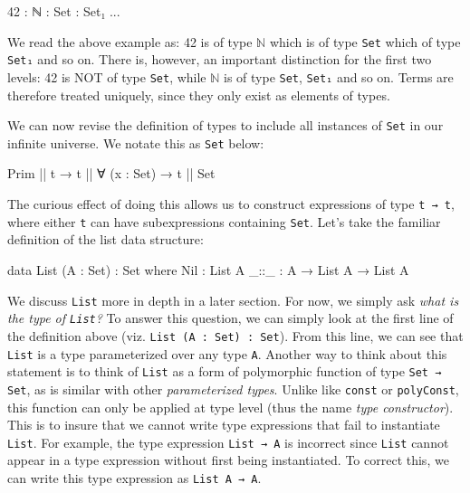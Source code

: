 \documentclass[12pt]{article}
\begin{document}
\begin{center}
\begin{minipage}{0.4\textwidth}
\begin{code}
42 : ℕ : Set : Set₁ ...
\end{code}
\end{minipage}
\end{center}

We read the above example as: 42 is of type \(\mathbb{N}\) which is of type
{\tt Set} which of type {\tt Set₁} and so on. There is, however, an important
distinction for the first two levels: 42 is NOT of type {\tt Set}, while
\(\mathbb{N}\) is of type {\tt Set}, {\tt Set₁} and so on. Terms are
therefore treated uniquely, since they only exist as elements of types.

We can now revise the definition of types to include all instances of
{\tt Set} in our infinite universe. We notate this as {\tt Set} below:

\begin{center}
\begin{minipage}{0.65\textwidth}
\begin{code}
Prim || t → t || ∀ (x : Set) → t || Set
\end{code}
\end{minipage}
\end{center}
The curious effect of doing this allows us to construct expressions of type
\mbox{{\tt t → t}}, where either {\tt t} can have subexpressions containing {\tt Set}.
Let's take the familiar definition of the list data structure:

\begin{center}
\begin{minipage}{0.65\textwidth}
\begin{code}
data List (A : Set) : Set where
  Nil  : List A
  _::_ : A → List A → List A
\end{code}
\end{minipage}
\end{center}

We discuss {\tt List} more in depth in a later section. For now, we simply ask
{\em what is the type of {\tt List}?} To answer this question, we can simply
look at the first line of the definition above (viz. {\tt List (A : Set) : Set}).
From this line, we can see that {\tt List} is a type parameterized over any type
{\tt A}. Another way to think about this statement is to think of {\tt List} as
a form of polymorphic function of type {\tt Set → Set}, as is similar with other
{\em parameterized types}. Unlike like {\tt const} or {\tt polyConst}, this
function can only be applied at type level (thus the name {\em type constructor}).
This is to insure that we cannot write type expressions that fail to instantiate
{\tt List}. For example, the type expression {\tt List → A} is incorrect since
{\tt List} cannot appear in a type expression without first being instantiated.
To correct this, we can write this type expression as {\tt List A → A}.
\end{document}

